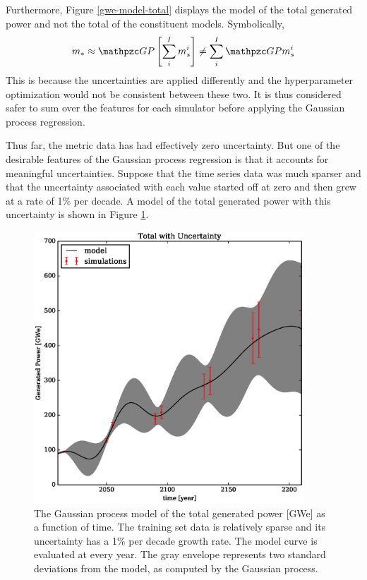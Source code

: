 \clearpage

Furthermore, Figure \ref{gwe-model-total} displays the model of the total generated
power and not the total of the constituent models. Symbolically, 
\begin{equation}
\label{total-model}
m_* \approx \GP \left[\sum_i^I m_s^i\right] \ne \sum_i^I \GP m_s^i
\end{equation}
This is because the uncertainties are applied differently and the hyperparameter
optimization would not be consistent between these two. It is thus considered safer
to sum over the features for each simulator before applying the Gaussian process
regression.

Thus far, the metric data has had effectively zero uncertainty.  But one of the 
desirable features of the Gaussian process regression is that it accounts for 
meaningful uncertainties. Suppose that the time series data was much sparser and that 
the uncertainty associated with each value started off at zero and then grew at 
a rate of 1\% per decade. A model of the total generated power with this uncertainty 
is shown in Figure \ref{gwe-model-total-with-uncertainty}.

\begin{figure}[htb]
\centering
\includegraphics[width=0.9\textwidth]{gwe-model-total-with-uncertainty.eps}
\caption{The Gaussian process model of the total generated power [GWe] 
as a function of time. The training set data is relatively sparse and its uncertainty
has a 1\% per decade growth rate. The model curve is evaluated at every year. The 
gray envelope represents two standard deviations from the model, as computed by 
the Gaussian process.}
\label{gwe-model-total-with-uncertainty}
\end{figure}

